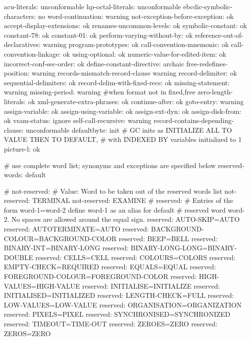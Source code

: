 acu-literals:				unconformable
hp-octal-literals:			unconformable
ebcdic-symbolic-characters:		no
word-continuation:			warning
not-exception-before-exception:		ok
accept-display-extensions:		ok
renames-uncommon-levels:		ok
symbolic-constant:			ok
constant-78:				ok
constant-01:				ok
perform-varying-without-by:		ok
reference-out-of-declaratives:		warning
program-prototypes:			ok
call-convention-mnemonic:		ok
call-convention-linkage:		ok
using-optional:		ok
numeric-value-for-edited-item:		ok
incorrect-conf-sec-order:		ok
define-constant-directive:		archaic
free-redefines-position:		warning
records-mismatch-record-clause	warning
record-delimiter:			ok
sequential-delimiters:			ok
record-delim-with-fixed-recs:		ok
missing-statement:			warning
missing-period:				warning #when format not in {fixed,free}
zero-length-literals:			ok
xml-generate-extra-phrases:		ok
continue-after:				ok
goto-entry:				warning
assign-variable:			ok
assign-using-variable:			ok
assign-ext-dyn:				ok
assign-disk-from:			ok
vsam-status:				ignore
self-call-recursive:		warning
record-contains-depending-clause:	unconformable
defaultbyte:		init	# GC inits as INITIALIZE ALL TO VALUE THEN TO DEFAULT,
            		    	# with INDEXED BY variables initialized to 1
picture-l:				ok

# use complete word list; synonyms and exceptions are specified below
reserved-words:		default

# not-reserved:
# Value: Word to be taken out of the reserved words list
not-reserved:	TERMINAL
not-reserved:	EXAMINE
# reserved:
#   Entries of the form word-1=word-2 define word-1 as an alias for default
# reserved word word-2. No spaces are allowed around the equal sign.
reserved:	AUTO-SKIP=AUTO
reserved:	AUTOTERMINATE=AUTO
reserved:	BACKGROUND-COLOUR=BACKGROUND-COLOR
reserved:	BEEP=BELL
reserved:	BINARY-INT=BINARY-LONG
reserved:	BINARY-LONG-LONG=BINARY-DOUBLE
reserved:	CELLS=CELL
reserved:	COLOURS=COLORS
reserved:	EMPTY-CHECK=REQUIRED
reserved:	EQUALS=EQUAL
reserved:	FOREGROUND-COLOUR=FOREGROUND-COLOR
reserved:	HIGH-VALUES=HIGH-VALUE
reserved:	INITIALISE=INITIALIZE
reserved:	INITIALISED=INITIALIZED
reserved:	LENGTH-CHECK=FULL
reserved:	LOW-VALUES=LOW-VALUE
reserved:	ORGANISATION=ORGANIZATION
reserved:	PIXELS=PIXEL
reserved:	SYNCHRONISED=SYNCHRONIZED
reserved:	TIMEOUT=TIME-OUT
reserved:	ZEROES=ZERO
reserved:	ZEROS=ZERO
